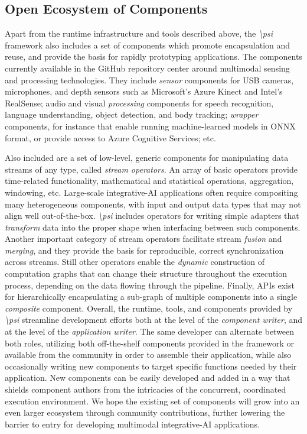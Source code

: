 \documentclass[letterpaper]{article} %
\newcommand{\psif}{\emph{\textbackslash psi} }
\begin{document}
\subsection{Open Ecosystem of Components}

Apart from the runtime infrastructure and tools described above, the \psif framework also includes a set of components which promote encapsulation and reuse, and provide the basis for rapidly prototyping applications. The components currently available in the GitHub repository center around multimodal sensing and processing technologies. They include \emph{sensor} components for USB cameras, microphones, and depth sensors such as Microsoft's Azure Kinect and Intel's RealSense; audio and visual \emph{processing} components for speech recognition, language understanding, object detection, and body tracking; \emph{wrapper} components, for instance that enable running machine-learned models in ONNX format, or provide access to Azure Cognitive Services; etc.

Also included are a set of low-level, generic components for manipulating data streams of any type, called \emph{stream operators}. An array of basic operators provide time-related functionality, mathematical and statistical operations, aggregation, windowing, etc. Large-scale integrative-AI applications often require compositing many heterogeneous components, with input and output data types that may not align well out-of-the-box. \psif includes operators for writing simple adapters that \emph{transform} data into the proper shape when interfacing between such components. Another important category of stream operators facilitate stream \emph{fusion} and \emph{merging}, and they provide the basis for reproducible, correct synchronization across streams. Still other operators enable the \emph{dynamic} construction of computation graphs that can change their structure throughout the execution process, depending on the data flowing through the pipeline. Finally, APIs exist for hierarchically encapsulating a sub-graph of multiple components into a single \emph{composite} component.  Overall, the runtime, tools, and components provided by \psif streamline development efforts both at the level of the \emph{component writer}, and at the level of the \emph{application writer}. The same developer can alternate between both roles, utilizing both off-the-shelf components provided in the framework or available from the community in order to assemble their application, while also occasionally writing new components to target specific functions needed by their application. New components can be easily developed and added in a way that shields component authors from the intricacies of the concurrent, coordinated execution environment. We hope the existing set of components will grow into an even larger ecosystem through community contributions, further lowering the barrier to entry for developing multimodal integrative-AI applications.
\end{document}
